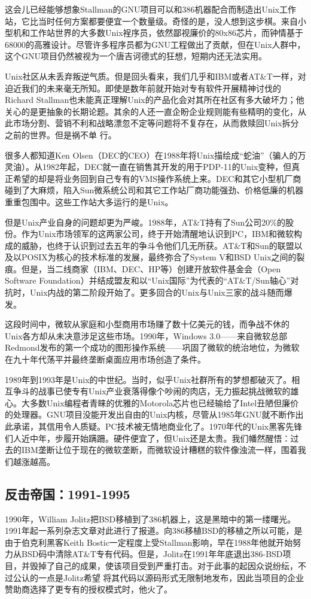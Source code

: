 \documentclass[12pt,oneside]{book}
\begin{document}
这会儿已经能够想象Stallman的GNU项目可以和386机器配合而制造出Unix工作站，它比当时任何方案都要便宜一个数量级。奇怪的是，没人想到这步棋。来自小型机和工作站世界的大多数Unix裎序员，依然鄙视廉价的80x86芯片，而钟情基于68000的高雅设计。尽管许多程序员都为GNU工程做出了贡献，但在Unix人群中，这个GNU项目仍然被视为一个唐吉诃德式的狂想，短期内还无法实用。

Unix社区从未丢弃叛逆气质。但是回头看来，我们几乎和IBM或者AT\&{}T一样，对迫近我们的未来毫无所知。即使是数年前就开始对专有软件开展精神讨伐的Richard Stallman也未能真正理解Unix的产品化会对其所在社区有多大破坏力；他关心的是更抽象的长期论题。其余的人还一直企盼企业规则能有些精明的变化，从此市场分割、营销不利和战略漂忽不定等问题将不复存在，从而救赎回Unix拆分之前的世界。但是祸不单
行。

很多人都知道Ken Olsen（DEC的CEO）在1988年将Unix描绘成“蛇油”（骗人的万灵油）。从1982年起，DEC就一直在销售其开发的用于PDP-11的Unix变种，但真正希望的却是将业务回到自己专有的VMS操作系统上来。DEC和其它小型机厂商碰到了大麻烦，陷入Sun微系统公司和其它工作站厂商功能强劲、价格低廉的机器重重包围中。这些工作站大多运行的是Unix。

但是Unix产业自身的问题却更为严峻。1988年，AT\&{}T持有了Sun公司20\%{}的股份。作为Unix市场领军的这两家公司，终于开始清醒地认识到PC，IBM和微软构成的威胁，也终于认识到过去五年的争斗令他们几无所获。AT\&{}T和Sun的联盟以及以POSIX为核心的技术标准的发展，最终弥合了System V和BSD Unix之间的裂痕。但是，当二线商家（IBM、DEC、HP等）创建开放软件基金会（Open Software Foundation）并结成盟友和以“Unix国际”为代表的“AT\&{}T/Sun轴心”对抗时，Unix内战的第二阶段开始了。更多回合的Unix与Unix三家的战斗随而爆发。

这段时间中，微软从家庭和小型商用市场赚了数十亿美元的钱，而争战不休的Unix各方却从未决意涉足这些市场。1990年，Windows 3.0——来自微软总部Redmond发布的第一个成功的图形操作系统——巩固了微软的统治地位，为微软在九十年代荡平并最终垄断桌面应用市场创造了条件。

1989年到1993年是Unix的中世纪。当时，似乎Unix社群所有的梦想都破灭了。相互争斗的战事已使专有Unix产业衰落得像个吵闹的肉店，无力振起挑战微软的雄心。大多数Unix编程者青睐的优雅的Motorola芯片也已经输给了Intel丑陋但廉价的处理器。GNU项目没能开发出自由的Unix内核，尽管从1985年GNU就不断作出此承诺，其信用令人质疑。PC技术被无情地商业化了。1970年代的Unix黑客先锋们人近中年，步履开始蹒跚。硬件便宜了，但Unix还是太贵。我们幡然醒悟：过去的IBM垄断让位于现在的微软垄断，而微软设计糟糕的软件像浊流一样，围着我们越涨越高。

\subsection{反击帝国：1991-1995}
1990年，William Jolitz把BSD移植到了386机器上，这是黑暗中的第一缕曙光。1991年起一系列杂志文章对此进行了报道。向386移植BSD的移植之所以可能，是由于伯克利黑客Keith Bostic一定程度上受Stallman影响，早在1988年他就开始努力从BSD码中清除AT\&{}T专有代码。但是，Jolitz在1991年年底退出386-BSD项目，并毁掉了自己的成果，使该项目受到严重打击。对于此事的起因众说纷纭，不过公认的一点是Jolitz希望
将其代码以源码形式无限制地发布，因此当项目的企业赞助商选择了更专有的授权模式时，他火了。
\end{document}
